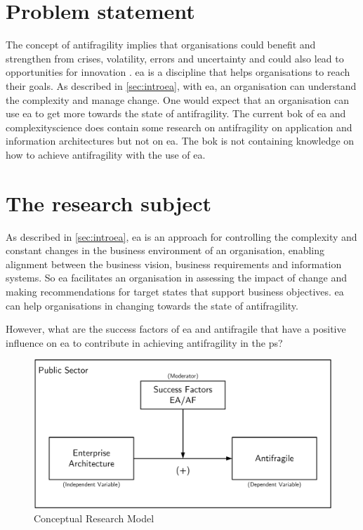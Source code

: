 \section{Problem statement}
\label{sec:problemstatement}
The concept of \gls{antifragility} implies that organisations could benefit and strengthen from crises, volatility, errors and uncertainty and could also lead to opportunities for innovation \parencite{Kastner2017}. \acrshort{ea} is a discipline that helps organisations to reach their goals. As described in \cref{sec:introea}, with \acrshort{ea}, an organisation can understand the complexity and manage change. One would expect that an organisation can use \acrshort{ea} to get more towards the state of \gls{antifragility}. The current \acrfull{bok} of \acrshort{ea} and \gls{complexityscience} does contain some research on \gls{antifragility} on application and information architectures but not on \acrshort{ea}. The \acrshort{bok} is not containing knowledge on how to achieve \gls{antifragility} with the use of \acrshort{ea}.
\section{The research subject}
\label{sec:researchsubject}
As described in \cref{sec:introea},  \acrshort{ea} is an approach for controlling the complexity and constant changes in the business environment of an organisation, enabling alignment between the business vision, business requirements and information systems. So \acrshort{ea} facilitates an organisation in assessing the impact of change and making recommendations for target states that support business objectives. \acrshort{ea} can help organisations in changing towards the state of \gls{antifragility}.

However, what are the success factors of \acrshort{ea} and \gls{antifragile} that have a positive influence on \acrshort{ea} to contribute in achieving \gls{antifragility} in the \gls{ps}? 
\begin{figure}[H]
	\centering
	\includegraphics[width=0.7\linewidth]{images/conceptualmodel}
	\caption[Conceptual Research Model]{Conceptual Research Model}
	\label{fig:conceptualmodel}
\end{figure}

